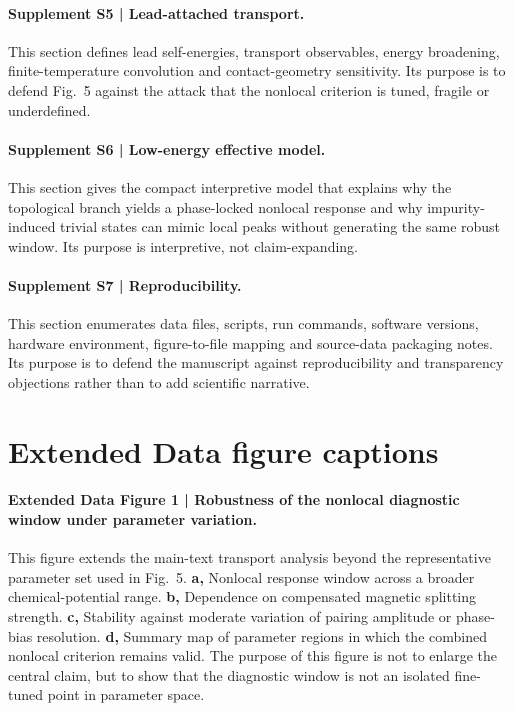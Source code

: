 \documentclass[11pt]{article}
\begin{document}
\paragraph{Supplement S5 | Lead-attached transport.}
This section defines lead self-energies, transport observables, energy broadening, finite-temperature convolution and contact-geometry sensitivity. Its purpose is to defend Fig.~5 against the attack that the nonlocal criterion is tuned, fragile or underdefined.

\paragraph{Supplement S6 | Low-energy effective model.}
This section gives the compact interpretive model that explains why the topological branch yields a phase-locked nonlocal response and why impurity-induced trivial states can mimic local peaks without generating the same robust window. Its purpose is interpretive, not claim-expanding.

\paragraph{Supplement S7 | Reproducibility.}
This section enumerates data files, scripts, run commands, software versions, hardware environment, figure-to-file mapping and source-data packaging notes. Its purpose is to defend the manuscript against reproducibility and transparency objections rather than to add scientific narrative.

\section*{Extended Data figure captions}

\paragraph{Extended Data Figure 1 | Robustness of the nonlocal diagnostic window under parameter variation.}
This figure extends the main-text transport analysis beyond the representative parameter set used in Fig.~5. \textbf{a,} Nonlocal response window across a broader chemical-potential range. \textbf{b,} Dependence on compensated magnetic splitting strength. \textbf{c,} Stability against moderate variation of pairing amplitude or phase-bias resolution. \textbf{d,} Summary map of parameter regions in which the combined nonlocal criterion remains valid. The purpose of this figure is not to enlarge the central claim, but to show that the diagnostic window is not an isolated fine-tuned point in parameter space.
\end{document}
